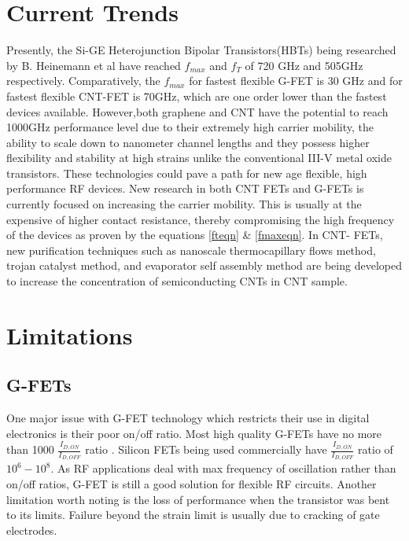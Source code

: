 \documentclass[a4paper,11pt]{article}
\begin{document}
\section{Current Trends}
Presently, the Si-GE Heterojunction Bipolar Transistors(HBTs) being researched by B. Heinemann et al\cite{heinemann2016sige} have reached $f_{max}$ and $f_T$ of 720 GHz and 505GHz respectively. Comparatively, the $f_{max}$ for fastest flexible G-FET is 30 GHz and for fastest flexible CNT-FET is 70GHz, which are one order lower than the fastest devices available. However,both graphene and CNT have the potential to reach 1000GHz performance level due to their extremely high carrier mobility, the ability to scale down to nanometer channel lengths and they possess higher flexibility and stability at high strains unlike the conventional III-V metal oxide transistors. These technologies could pave a path for new age flexible, high performance RF devices.       
\newline
New research in both CNT FETs and G-FETs is currently focused on increasing the carrier mobility. This is usually at the expensive of higher contact resistance, thereby compromising the high frequency of the devices as proven by the equations \ref{fteqn} \& \ref{fmaxeqn}. In CNT- FETs, new purification techniques such as nanoscale thermocapillary flows method\cite{jin2013using}, trojan catalyst method\cite{hu2015growth}, and evaporator self assembly method\cite{brady2016quasi}  are being developed to increase the concentration of semiconducting CNTs in CNT sample.   

\section{Limitations}
\subsection{G-FETs}
One major issue with G-FET technology which restricts their use in digital electronics is their poor on/off ratio. Most high quality G-FETs have no more than 1000 $\frac{I_{D,ON}}{I_{D,OFF}}$ ratio \cite{vu2017high}. Silicon FETs being used commercially have $\frac{I_{D,ON}}{I_{D,OFF}}$ ratio of $10^6 - 10^8$. As RF applications deal with max frequency of oscillation rather than on/off ratios, G-FET is still a good solution for flexible RF circuits. Another limitation worth noting is the loss of performance when the transistor was bent to its limits\cite{yeh2014gigahertz}. Failure beyond the strain limit is usually due to cracking of gate electrodes\cite{petrone2012graphene}.
\end{document}
